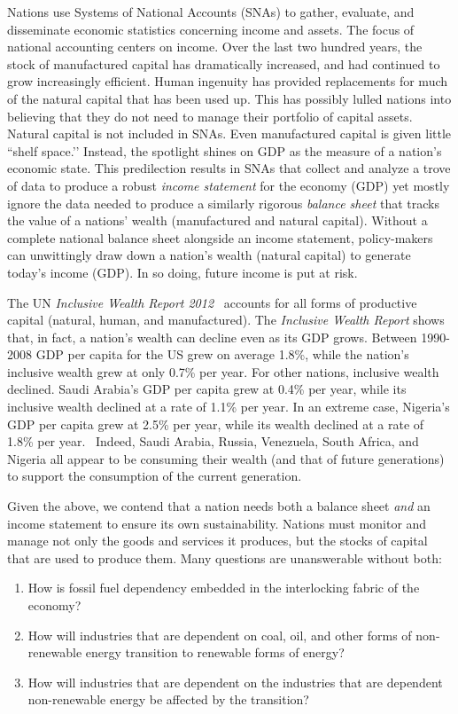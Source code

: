 Nations use Systems of National Accounts (SNAs) to gather, evaluate, and disseminate economic statistics concerning income and
 assets. The focus of national accounting centers on income. Over the last two hundred years, the stock of manufactured capital has
 dramatically increased, and had continued to grow increasingly efficient. Human ingenuity has provided replacements for much of the
 natural capital that has been used up. This has possibly lulled nations into believing that they do not need to manage their portfolio of
 capital assets. Natural capital is not included in SNAs. Even manufactured capital is given little ``shelf space.’’ Instead, the spotlight
 shines on GDP as the measure of a nation’s economic state. This predilection results in SNAs that collect and analyze a trove of data to
 produce a robust \emph{income statement} for the economy (GDP) yet mostly ignore the data needed to produce a similarly rigorous
 \emph{balance sheet} that tracks the value of a nations’ wealth (manufactured and natural capital). Without a complete national
 balance sheet alongside an income statement, policy-makers can unwittingly draw down a nation’s wealth (natural capital) to generate
 today’s income (GDP). In so doing, future income is put at risk. 

The UN \emph{Inclusive Wealth Report 2012}~\cite{IWR2012} accounts for all forms of productive capital (natural, human, and
 manufactured). The \emph{Inclusive Wealth Report} shows that, in fact, a nation’s wealth can decline even as its GDP grows. Between
 1990-2008 GDP per capita for the US grew on average 1.8\%, while the nation's inclusive wealth grew at only 0.7\% per year. For
 other nations, inclusive wealth declined. Saudi Arabia's GDP per capita grew at 0.4\% per year, while its inclusive wealth declined at a
 rate of 1.1\% per year. In an extreme case, Nigeria's GDP per capita grew at 2.5\% per year, while its wealth declined at a rate of
 1.8\% per year.~\cite[p. 44]{IWR2012}  Indeed, Saudi Arabia, Russia, Venezuela, South Africa, and Nigeria all appear to be consuming
 their wealth (and that of future generations) to support the consumption of the current generation.

Given the above, we contend that a nation needs both a balance sheet \emph{and} an income statement to ensure its own sustainability. Nations must monitor and manage not only the goods and services it produces, but the stocks of capital that are used to produce them. Many questions are unanswerable without both:

\begin{enumerate}
     \item{How is fossil fuel dependency embedded in the interlocking fabric of the economy?} 
     \item{How will industries that are dependent on coal, oil, and other forms of non-renewable energy transition to renewable forms of energy?} 
     \item{How will industries that are dependent on the industries that are dependent non-renewable energy be affected by the transition?} 
\end{enumerate}

